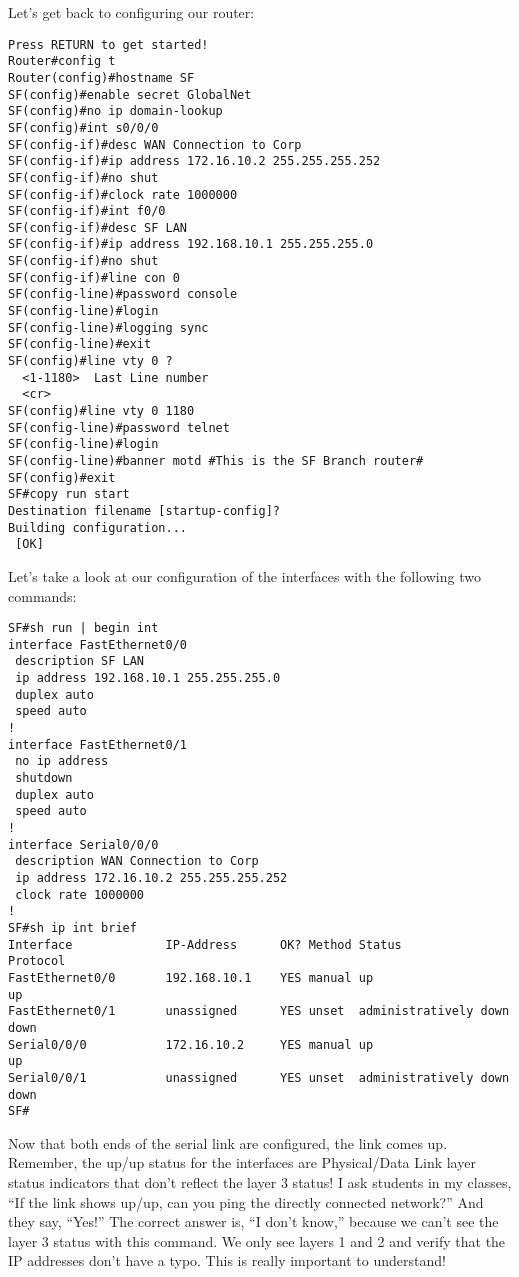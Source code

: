 Let's get back to configuring our router:

\begin{verbatim}
Press RETURN to get started!
Router#config t
Router(config)#hostname SF
SF(config)#enable secret GlobalNet
SF(config)#no ip domain-lookup
SF(config)#int s0/0/0
SF(config-if)#desc WAN Connection to Corp
SF(config-if)#ip address 172.16.10.2 255.255.255.252
SF(config-if)#no shut
SF(config-if)#clock rate 1000000
SF(config-if)#int f0/0
SF(config-if)#desc SF LAN
SF(config-if)#ip address 192.168.10.1 255.255.255.0
SF(config-if)#no shut
SF(config-if)#line con 0
SF(config-line)#password console
SF(config-line)#login
SF(config-line)#logging sync
SF(config-line)#exit
SF(config)#line vty 0 ?
  <1-1180>  Last Line number
  <cr>
SF(config)#line vty 0 1180
SF(config-line)#password telnet
SF(config-line)#login
SF(config-line)#banner motd #This is the SF Branch router#
SF(config)#exit
SF#copy run start
Destination filename [startup-config]?
Building configuration...
 [OK]
\end{verbatim}

Let's take a look at our configuration of the interfaces with the
following two commands:

\begin{verbatim}
SF#sh run | begin int
interface FastEthernet0/0
 description SF LAN
 ip address 192.168.10.1 255.255.255.0
 duplex auto
 speed auto
!
interface FastEthernet0/1
 no ip address
 shutdown
 duplex auto
 speed auto
!
interface Serial0/0/0
 description WAN Connection to Corp
 ip address 172.16.10.2 255.255.255.252
 clock rate 1000000
!
SF#sh ip int brief
Interface             IP-Address      OK? Method Status                Protocol
FastEthernet0/0       192.168.10.1    YES manual up                    up
FastEthernet0/1       unassigned      YES unset  administratively down down
Serial0/0/0           172.16.10.2     YES manual up                    up
Serial0/0/1           unassigned      YES unset  administratively down down
SF#
\end{verbatim}

Now that both ends of the serial link are configured, the link comes up.
Remember, the up/up status for the interfaces are Physical/Data Link
layer status indicators that don't reflect the layer 3 status! I ask
students in my classes, ``If the link shows up/up, can you ping the
directly connected network?'' And they say, ``Yes!'' The correct answer
is, ``I don't know,'' because we can't see the layer 3 status with this
command. We only see layers 1 and 2 and verify that the IP addresses
don't have a typo. This is really important to understand!

